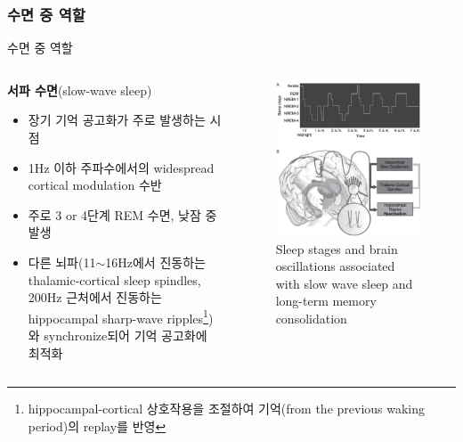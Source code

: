 \documentclass{beamer}
\begin{document}
\subsubsection{수면 중 역할}
\begin{frame}{수면 중 역할}
  \begin{columns}
    \begin{column}{0.58\textwidth}
      \textbf{서파 수면}(slow-wave sleep)
      \begin{itemize}
        \item 장기 기억 공고화가 주로 발생하는 시점
        \item 1Hz 이하 주파수에서의 widespread cortical modulation 수반
        \item 주로 3 or 4단계 REM 수면, 낮잠 중 발생
        \item 다른 뇌파(11$\sim$16Hz에서 진동하는 thalamic-cortical sleep spindles, 200Hz 근처에서 진동하는 hippocampal sharp-wave ripples\footnote{hippocampal-cortical 상호작용을 조절하여 기억(from the previous waking period)의 replay를 반영})와 synchronize되어 기억 공고화에 최적화
      \end{itemize}
    \end{column}
    \hfill
    \begin{column}{0.42\textwidth}
      \begin{figure}
        \centering
        \includegraphics[width=\textwidth]{image/sleep_stages}
        \caption{Sleep stages and brain oscillations associated with slow wave sleep and long-term memory consolidation}
      \end{figure}
    \end{column}
  \end{columns}
\end{frame}
\end{document}
